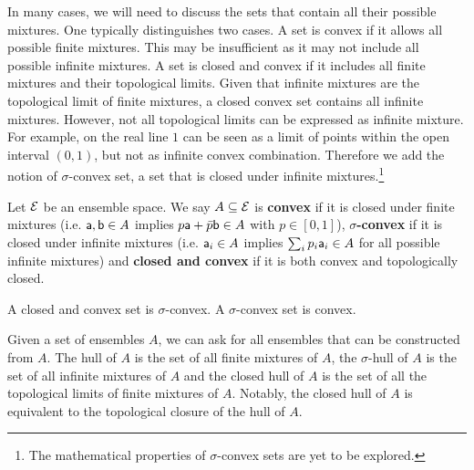 In many cases, we will need to discuss the sets that contain all their possible mixtures. One typically distinguishes two cases. A set is convex if it allows all possible finite mixtures. This may be insufficient as it may not include all possible infinite mixtures. A set is closed and convex if it includes all finite mixtures and their topological limits. Given that infinite mixtures are the topological limit of finite mixtures, a closed convex set contains all infinite mixtures. However, not all topological limits can be expressed as infinite mixture. For example, on the real line $1$ can be seen as a limit of points within the open interval $(0,1)$, but not as infinite convex combination. Therefore we add the notion of $\sigma$-convex set, a set that is closed under infinite mixtures.\footnote{The mathematical properties of $\sigma$-convex sets are yet to be explored.}

\begin{mathSection}
\begin{defn}
	Let $\Ens$ be an ensemble space. We say $A \subseteq \Ens$ is \textbf{convex} if it is closed under finite mixtures (i.e. $\ens[a],\ens[b] \in A$ implies $p\ens[a] + \bar{p} \ens[b] \in A$ with $p \in [0,1]$), \textbf{$\sigma$-convex} if it is closed under infinite mixtures (i.e. $\ens[a]_i \in A$ implies $\sum_i p_i \ens[a]_i \in A$ for all possible infinite mixtures) and \textbf{closed and convex} if it is both convex and topologically closed.
\end{defn}

\begin{coro}
	A closed and convex set is $\sigma$-convex. A $\sigma$-convex set is convex.
\end{coro}
\end{mathSection}

Given a set of ensembles $A$, we can ask for all ensembles that can be constructed from $A$. The hull of $A$ is the set of all finite mixtures of $A$, the $\sigma$-hull of $A$ is the set of all infinite mixtures of $A$ and the closed hull of $A$ is the set of all the topological limits of finite mixtures of $A$. Notably, the closed hull of $A$ is equivalent to the topological closure of the hull of $A$.

